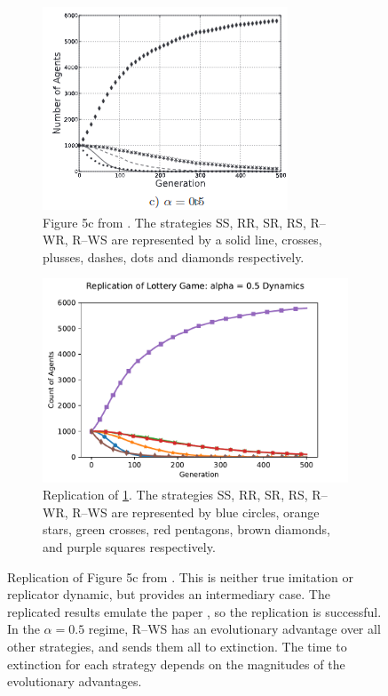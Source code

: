 \FloatBarrier 
\begin{figure}[!h]
  \begin{subfigure}[b]{0.45\textwidth}
    \includegraphics[width=\textwidth]{images/lottery3.png}
    \caption{Figure 5c from \cite{RN30}. The strategies SS, RR, SR, RS, R--WR, R--WS are represented by a solid line, crosses, plusses, dashes, dots and diamonds respectively. }
    \label{lottery3}
  \end{subfigure}
  \hfill
  \begin{subfigure}[b]{0.45\textwidth}
    \includegraphics[width=1.25\textwidth]{images/lottery3_me.pdf}
    \caption{Replication of \ref{lottery3}. The strategies SS, RR, SR, RS, R--WR, R--WS are represented by blue circles, orange stars, green crosses, red pentagons, brown diamonds, and purple squares respectively. }
    \label{lottery3_me}
  \end{subfigure}
  \caption{Replication of Figure 5c from \cite{RN30}. This is neither true imitation or replicator dynamic, but provides an intermediary case. The replicated results emulate the paper \cite{RN30}, so the replication is successful. In the $\alpha = 0.5$ regime, R--WS has an evolutionary advantage over all other strategies, and sends them all to extinction. The time to extinction for each strategy depends on the magnitudes of the evolutionary advantages. } \label{lottery_comp2}
\end{figure} 
